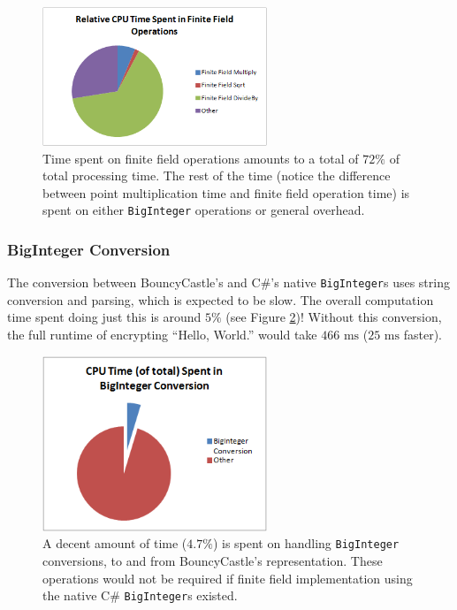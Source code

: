 \begin{figure}[htb]
	\centering
	\includegraphics[width=0.6\textwidth]{performance/finite-field--relative-time}
	\caption{Time spent on finite field operations amounts to a total of \(72\%\) of total processing time. The rest of the time (notice the
		difference between point multiplication time and finite field operation time) is spent on either \texttt{BigInteger} operations or 
		general overhead.}
	\label{fig:finite-field-performance}
\end{figure}

\subsubsection{BigInteger Conversion}
\label{sec:performance_components_biginteger}

The conversion between BouncyCastle's and C\#'s native \texttt{BigInteger}s uses string conversion and parsing, which is expected to be slow.
The overall computation time spent doing just this is around \(5\%\) (see Figure \ref{fig:biginteger-performance})! Without this conversion,
the full runtime of encrypting ``Hello, World.'' would take \(466 \text{ ms}\) (\(25 \text{ ms}\) faster).

\begin{figure}[htb!]
	\centering
	\includegraphics[width=0.6\textwidth]{performance/biginteger-conversion--relative-time}
	\caption{A decent amount of time (\(4.7\%\)) is spent on handling \texttt{BigInteger} conversions, to and from BouncyCastle's representation.
		These operations would not be required if finite field implementation using the native C\# \texttt{BigInteger}s existed.}
	\label{fig:biginteger-performance}
\end{figure}